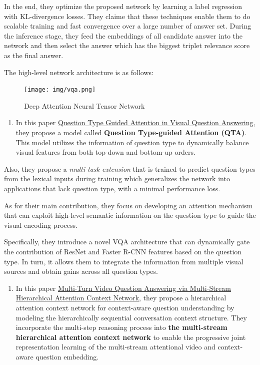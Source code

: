 \documentclass{acm_proc_article-sp}
\providecommand{\tightlist}{%
  \setlength{\itemsep}{0pt}\setlength{\parskip}{0pt}}
\begin{document}
In the end, they optimize the proposed network by learning a label
regression with KL-divergence losses. They claime that these techniques
enable them to do scalable training and fast convergence over a large
number of answer set. During the inference stage, they feed the
embeddings of all candidate answer into the network and then select the
answer which has the biggest triplet relevance score as the final
answer.

The high-level network architecture is as follows:

\begin{figure}
\centering
\texttt{[image: img/vqa.png]}
\caption{Deep Attention Neural Tensor Network}
\end{figure}

\begin{enumerate}
\def\labelenumi{\arabic{enumi}.}
\setcounter{enumi}{1}
\tightlist
\item
  In this paper \href{https://arxiv.org/pdf/1804.02088.pdf}{Question
  Type Guided Attention in Visual Question Answering}, they propose a
  model called \textbf{Question Type-guided Attention (QTA)}. This model
  utilizes the information of question type to dynamically balance
  visual features from both top-down and bottom-up orders.
\end{enumerate}

Also, they propose a \emph{multi-task extension} that is trained to
predict question types from the lexical inputs during training which
generalizes the network into applications that lack question type, with
a minimal performance loss.

As for their main contribution, they focus on developing an attention
mechanism that can exploit high-level semantic information on the
question type to guide the visual encoding process.

Specifically, they introduce a novel VQA architecture that can
dynamically gate the contribution of ResNet and Faster R-CNN features
based on the question type. In turn, it allows them to integrate the
information from multiple visual sources and obtain gains across all
question types.

\begin{enumerate}
\def\labelenumi{\arabic{enumi}.}
\setcounter{enumi}{2}
\tightlist
\item
  In this paper
  \href{https://www.ijcai.org/proceedings/2018/0513.pdf}{Multi-Turn
  Video Question Answering via Multi-Stream Hierarchical Attention
  Context Network}, they propose a hierarchical attention context
  network for context-aware question understanding by modeling the
  hierarchically sequential conversation context structure. They
  incorporate the multi-step reasoning process into \textbf{the
  multi-stream hierarchical attention context network} to enable the
  progressive joint representation learning of the multi-stream
  attentional video and context-aware question embedding.
\end{enumerate}
\end{document}
